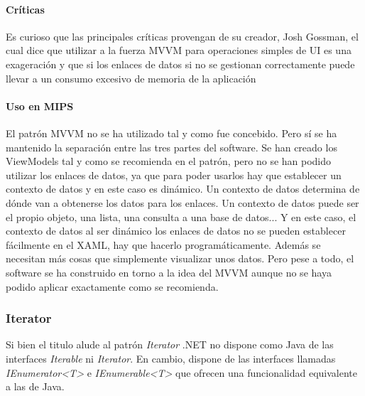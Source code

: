\paragraph{Cr\'{i}ticas}
Es curioso que las principales cr\'{i}ticas provengan de su creador, Josh Gossman, el cual dice que utilizar a la fuerza MVVM para operaciones simples
de UI es una exageraci\'{o}n y que si los enlaces de datos si no se gestionan correctamente puede llevar a un consumo excesivo de 
memoria de la aplicaci\'{o}n \cite{MVVM:Criticism}

\paragraph{Uso en MIPS}
El patr\'on MVVM no se ha utilizado tal y como fue concebido. Pero s\'i se ha mantenido la separaci\'on entre
las tres partes del software. Se han creado los ViewModels tal y como se recomienda en el patr\'on, pero no
se han podido utilizar los enlaces de datos, ya que para poder usarlos hay que establecer un contexto de datos
y en este caso es din\'amico. Un contexto de datos determina de d\'onde van a obtenerse los datos para
los enlaces. Un contexto de datos puede ser el propio objeto, una lista, una consulta a una base de datos...
Y en este caso, el contexto de datos al ser din\'amico los enlaces de datos no se pueden 
establecer f\'acilmente en el XAML, hay que hacerlo
program\'aticamente. Adem\'as se necesitan m\'as cosas que simplemente visualizar unos datos. Pero
pese a todo, el software se ha construido en torno a la idea del MVVM aunque no se haya podido aplicar exactamente
como se recomienda.

\subsubsection{Iterator}
Si bien el titulo alude al patr\'{o}n \emph{Iterator} .NET no dispone como Java de las interfaces \emph{Iterable} ni
\emph{Iterator}.
En cambio, dispone de las interfaces llamadas \emph{IEnumerator<T>} e \emph{IEnumerable<T>} 
que ofrecen una funcionalidad equivalente a las de Java.

